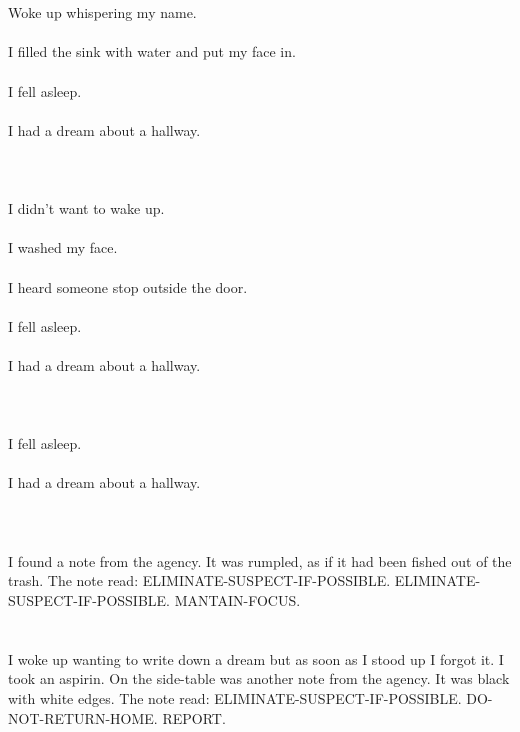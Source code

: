 \documentclass{article}
\begin{document}
    \section{}
    Woke up whispering my name.\\\\I filled the sink with water and put my face in.\\\\I fell asleep.\\\\I had a dream about a hallway.\\\\ 
    \newpage
    
    \section{}
    I didn't want to wake up.\\\\I washed my face.\\\\I heard someone stop outside the door.\\\\I fell asleep.\\\\I had a dream about a hallway.\\\\ 
    \newpage
    
    \section{}
    I fell asleep.\\\\I had a dream about a hallway.\\\\ 
    \newpage
    
    \section{}
    I found a note from the agency. It was rumpled, as if it had been fished out of the trash. The note read: ELIMINATE-SUSPECT-IF-POSSIBLE. ELIMINATE-SUSPECT-IF-POSSIBLE. MANTAIN-FOCUS.  
    \newpage
    
    \section{}
    I woke up wanting to write down a dream but as soon as I stood up I forgot it. I took an aspirin. On the side-table was another note from the agency. It was black with white edges. The note read: ELIMINATE-SUSPECT-IF-POSSIBLE. DO-NOT-RETURN-HOME. REPORT.  
    \newpage
    
\end{document}
